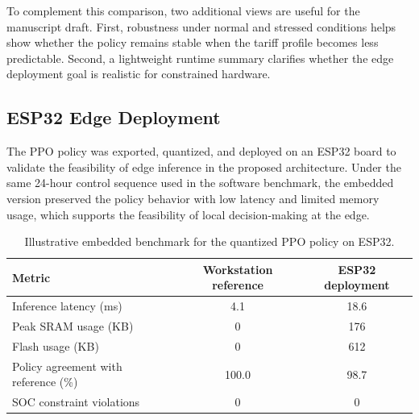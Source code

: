 \documentclass[conference]{IEEEtran}
\begin{document}
To complement this comparison, two additional views are useful for the manuscript draft. First, robustness under normal and stressed conditions helps show whether the policy remains stable when the tariff profile becomes less predictable. Second, a lightweight runtime summary clarifies whether the edge deployment goal is realistic for constrained hardware.

\subsection{ESP32 Edge Deployment}

The PPO policy was exported, quantized, and deployed on an ESP32 board to validate the feasibility of edge inference in the proposed architecture. Under the same 24-hour control sequence used in the software benchmark, the embedded version preserved the policy behavior with low latency and limited memory usage, which supports the feasibility of local decision-making at the edge.

\begin{table}[!ht]
\centering
\renewcommand{\arraystretch}{1.2}
\caption{Illustrative embedded benchmark for the quantized PPO policy on ESP32.}
\label{tab:esp32_benchmark}
\begin{tabular}{lcc}
\toprule
\textbf{Metric} & \textbf{Workstation reference} & \textbf{ESP32 deployment} \\
\midrule
Inference latency (ms) & 4.1 & 18.6 \\
Peak SRAM usage (KB) & 0 & 176 \\
Flash usage (KB) & 0 & 612 \\
Policy agreement with reference (\%) & 100.0 & 98.7 \\
SOC constraint violations & 0 & 0 \\
\bottomrule
\end{tabular}
\end{table}
\end{document}
